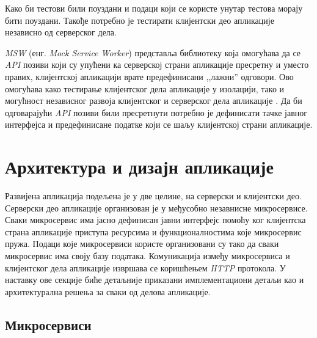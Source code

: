 \documentclass[12pt,oneside]{memoir}
\begin{document}
Како би тестови били поуздани и подаци који се користе унутар тестова морају бити поуздани. Такође потребно је тестирати клијентски део апликације независно од серверског дела. 

\textit{MSW} (енг. \textit{Mock Service Worker}) представља библиотеку која омогућава да се \textit{API} позиви који су упућени ка серверској страни апликације пресретну и уместо правих, клијентској апликацији врате предефинисани ,,лажни” одговори. Ово омогућава како тестирање клијентског дела апликације у изолацији, тако и могућност независног развоја клијентског и серверског дела апликације \cite{msw}. Да би одговарајући \textit{API} позиви били пресретнути потребно је дефинисати тачке јавног интерфејса и предефинисане податке који се шаљу клијентској страни апликације.



\section{Архитектура и дизајн апликације}

Развијена апликација подељена је у две целине, на серверски и клијентски део. Серверски део апликације организован је у међусобно незавнисне микросервисе. Сваки микросервис има јасно дефинисан јавни интерфејс помоћу ког клијентска страна апликације приступа ресурсима и функционалностима које микросервис пружа. Подаци које микросервиси користе организовани су тако да сваки микросервис има своју базу података. Комуникација између микросервиса и клијентског дела апликације извршава се коришћењем \textit{HTTP} протокола. У наставку ове секције биће детаљније приказани имплементациони детаљи као и архитектурална решења за сваки од делова апликације.


\subsection{Микросервиси}
\end{document}

